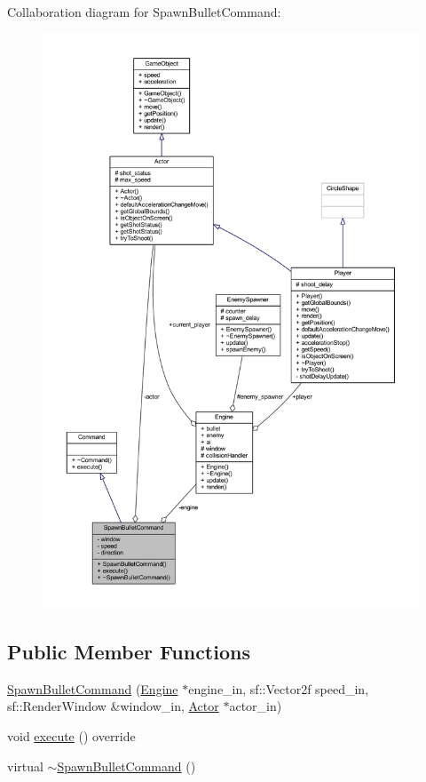 Collaboration diagram for Spawn\+Bullet\+Command\+:
\nopagebreak
\begin{figure}[H]
\begin{center}
\leavevmode
\includegraphics[width=350pt]{class_spawn_bullet_command__coll__graph}
\end{center}
\end{figure}
\subsection*{Public Member Functions}
\begin{DoxyCompactItemize}
\item 
\hyperlink{class_spawn_bullet_command_afb9ba5b912fcd791bf294433f0888b25}{Spawn\+Bullet\+Command} (\hyperlink{class_engine}{Engine} $\ast$engine\+\_\+in, sf\+::\+Vector2f speed\+\_\+in, sf\+::\+Render\+Window \&window\+\_\+in, \hyperlink{class_actor}{Actor} $\ast$actor\+\_\+in)
\item 
void \hyperlink{class_spawn_bullet_command_a558af584b91637cd6bcf989d799eca4d}{execute} () override
\item 
virtual \hyperlink{class_spawn_bullet_command_ac22b1ce86d8ae1d7fb1df78745cb4db6}{$\sim$\+Spawn\+Bullet\+Command} ()
\end{DoxyCompactItemize}
